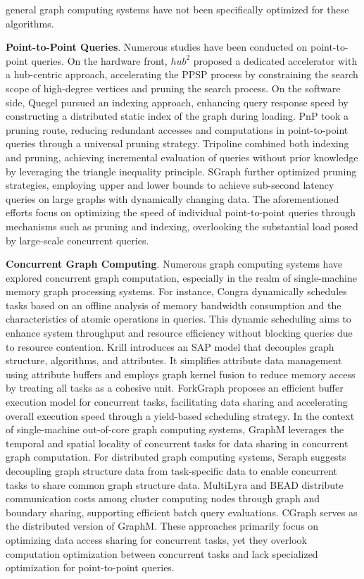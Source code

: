 \documentclass[lettersize,journal]{IEEEtran} %
\begin{document}
general graph computing systems have not been specifically optimized for these algorithms.

{\bf{Point-to-Point Queries}}. Numerous studies have been conducted on point-to-point queries. On the hardware front, $hub^2$\cite{hub} proposed a dedicated accelerator with a hub-centric approach, accelerating the PPSP process by constraining the search scope of high-degree vertices and pruning the search process. On the software side, Quegel\cite{quegel} pursued an indexing approach, enhancing query response speed by constructing a distributed static index of the graph during loading. PnP\cite{pnp} took a pruning route, reducing redundant accesses and computations in point-to-point queries through a universal pruning strategy. Tripoline\cite{tripoline} combined both indexing and pruning, achieving incremental evaluation of queries without prior knowledge by leveraging the triangle inequality principle. SGraph\cite{sgraph} further optimized pruning strategies, employing upper and lower bounds to achieve sub-second latency queries on large graphs with dynamically changing data. The aforementioned efforts focus on optimizing the speed of individual point-to-point queries through mechanisms such as pruning and indexing, overlooking the substantial load posed by large-scale concurrent queries.

{\bf{Concurrent Graph Computing}}. Numerous graph computing systems have explored concurrent graph computation, especially in the realm of single-machine memory graph processing systems. For instance, Congra\cite{Congra} dynamically schedules tasks based on an offline analysis of memory bandwidth consumption and the characteristics of atomic operations in queries. This dynamic scheduling aims to enhance system throughput and resource efficiency without blocking queries due to resource contention. Krill\cite{krill} introduces an SAP model that decouples graph structure, algorithms, and attributes. It simplifies attribute data management using attribute buffers and employs graph kernel fusion to reduce memory access by treating all tasks as a cohesive unit. ForkGraph\cite{cache} proposes an efficient buffer execution model for concurrent tasks, facilitating data sharing and accelerating overall execution speed through a yield-based scheduling strategy. In the context of single-machine out-of-core graph computing systems, GraphM\cite{graphm} leverages the temporal and spatial locality of concurrent tasks for data sharing in concurrent graph computation. For distributed graph computing systems, Seraph\cite{seraph} suggests decoupling graph structure data from task-specific data to enable concurrent tasks to share common graph structure data. MultiLyra\cite{multilyra} and BEAD\cite{bead} distribute communication costs among cluster computing nodes through graph and boundary sharing, supporting efficient batch query evaluations. CGraph\cite{cgraph} serves as the distributed version of GraphM\cite{graphm}. These approaches primarily focus on optimizing data access sharing for concurrent tasks, yet they overlook computation optimization between concurrent tasks and lack specialized optimization for point-to-point queries.
\end{document}
